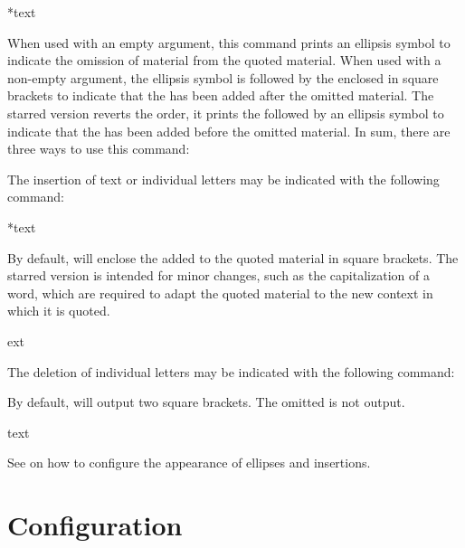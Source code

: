 \documentclass{ltxdockit}[2010/09/26]
\begin{document}
\begin{ltxsyntax}

*{text}

When used with an empty  argument, this command prints an ellipsis symbol to indicate the omission of material from the quoted material. When used with a non-empty argument, the ellipsis symbol is followed by the  enclosed in square brackets to indicate that the  has been added after the omitted material. The starred version reverts the order, \ie it prints the  followed by an ellipsis symbol to indicate that the  has been added before the omitted material. In sum, there are three ways to use this command:

\begin{ltxcode}[escapechar={\%},escapebegin={\rmfamily}]
\textelp{}	%
\end{ltxcode}
%
The insertion of text or individual letters may be indicated with the following command:

*{text}

By default,  will enclose the  added to the quoted material in square brackets. The starred version is intended for minor changes, such as the capitalization of a word, which are required to adapt the quoted material to the new context in which it is quoted.

\begin{ltxcode}[escapechar={\%},escapebegin={\rmfamily}]
ext	%
\end{ltxcode}
%
The deletion of individual letters may be indicated with the following command:


By default,  will output two square brackets. The omitted  is not output.

\begin{ltxcode}[escapechar={\%},escapebegin={\rmfamily}]
	text	%
\end{ltxcode}
%
See  on how to configure the appearance of ellipses and insertions.

\end{ltxsyntax}

\section{Configuration}
\label{cfg}
\end{document}

